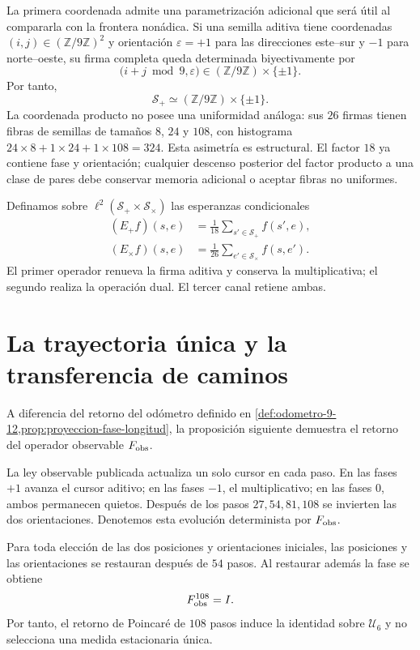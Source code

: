 La primera coordenada admite una parametrización adicional que será útil al
compararla con la frontera nonádica. Si una semilla aditiva tiene coordenadas
\((i,j)\in(\mathbb Z/9\mathbb Z)^2\) y orientación
\(\varepsilon=+1\) para las direcciones este--sur y \(-1\) para
norte--oeste, su firma completa queda determinada biyectivamente por
\[
 \bigl(i+j\bmod9,\varepsilon\bigr)
 \in(\mathbb Z/9\mathbb Z)\times\{\pm1\}.
\]
Por tanto,
\[
 \boxed{\mathcal S_+\simeq
 (\mathbb Z/9\mathbb Z)\times\{\pm1\}.}
\]
La coordenada producto no posee una uniformidad análoga: sus \(26\) firmas
tienen fibras de semillas de tamaños \(8\), \(24\) y \(108\), con histograma
\(24\times8+1\times24+1\times108=324\). Esta asimetría es estructural. El
factor \(18\) ya contiene fase y orientación; cualquier descenso posterior
del factor producto a una clase de pares debe conservar memoria adicional o
aceptar fibras no uniformes.

Definamos sobre \(\ell^2(\mathcal S_+\times\mathcal S_\times)\) las
esperanzas condicionales
\[
\begin{aligned}
 (E_+f)(s,e)&=\frac1{18}\sum_{s'\in\mathcal S_+}f(s',e),\\
 (E_\times f)(s,e)&=\frac1{26}\sum_{e'\in\mathcal S_\times}f(s,e').
\end{aligned}
\]
El primer operador renueva la firma aditiva y conserva la multiplicativa;
el segundo realiza la operación dual. El tercer canal retiene ambas.

\section{La trayectoria única y la transferencia de caminos}

A diferencia del retorno del odómetro definido en
\cref{def:odometro-9-12,prop:proyeccion-fase-longitud}, la proposición
siguiente demuestra el retorno del operador observable \(F_{\rm obs}\).

La ley observable publicada actualiza un solo cursor en cada paso. En las
fases \(+1\) avanza el cursor aditivo; en las fases \(-1\), el
multiplicativo; en las fases \(0\), ambos permanecen quietos. Después de los
pasos \(27,54,81,108\) se invierten las dos orientaciones. Denotemos esta
evolución determinista por \(F_{\rm obs}\).

\begin{proposition}
\label{prop:retorno-fobs-identidad}
Para toda elección de las dos posiciones y orientaciones iniciales, las
posiciones y las orientaciones se restauran después de \(54\) pasos. Al
restaurar además la fase se obtiene
\[
 F_{\rm obs}^{108}=I.
\]
Por tanto, el retorno de Poincaré de \(108\) pasos induce la identidad sobre
\(\mathcal U_6\) y no selecciona una medida estacionaria única.
\end{proposition}

